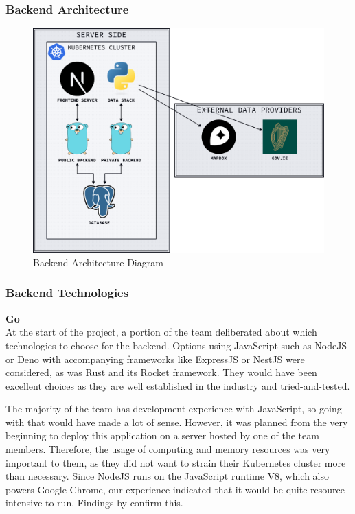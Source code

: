 \subsubsection{Backend Architecture}

\begin{figure}[htbp]
  \centering{}
  \includegraphics[width=0.8\columnwidth]{../d2-diagrams/system-diagram/system-diagram-backend.png}
  \caption{Backend Architecture Diagram}
  \label{fig:arcgis}
\end{figure}

\subsubsection{Backend Technologies}
\textbf{Go}\\
At the start of the project, a portion of the team deliberated about which
technologies to choose for the backend. Options using JavaScript such as NodeJS
or Deno with accompanying frameworks like ExpressJS or NestJS were considered,
as was Rust and its Rocket framework. They would have been excellent choices as
they are well established in the industry and tried-and-tested.

The majority of the team has development experience with JavaScript, so going
with that would have made a lot of sense. However, it was planned from the very
beginning to deploy this application on a server hosted by one of the team
members. Therefore, the usage of computing and memory resources was very
important to them, as they did not want to strain their Kubernetes cluster more
than necessary. Since NodeJS runs on the JavaScript runtime V8, which also
powers Google Chrome, our experience indicated that it would be quite resource
intensive to run. Findings by \textcite{Tanadechopon2023} confirm this.

